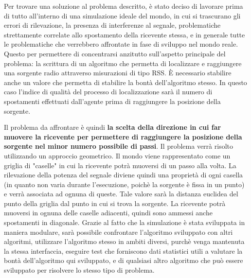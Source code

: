 Per trovare una soluzione al problema descritto, è stato deciso di lavorare prima di tutto all'interno di una simulazione ideale del mondo, in cui si trascurano gli errori di rilevazione, la presenza di interferenze al segnale, problematiche strettamente correlate allo spostamento della ricevente stessa, e in generale tutte le problematiche che verrebbero affrontate in fase di sviluppo nel mondo reale. Questo per permettere di concentrarsi anzitutto sull'aspetto principale del problema: la scrittura di un algoritmo che permetta di localizzare e raggiungere una sorgente radio attraverso misurazioni di tipo RSS. È necessario stabilire anche un valore che permetta di stabilire la bontà dell'algoritmo stesso. In questo caso l'indice di qualità del processo di localizzazione sarà il numero di spostamenti effettuati dall'agente prima di raggiungere la posizione della sorgente.

Il problema da affrontare è quindi \textbf{la scelta della direzione in cui far muovere la ricevente per permettere di raggiungere la posizione della sorgente nel minor numero possibile di passi}. Il problema verrà risolto utilizzando un approccio geometrico. Il mondo viene rappresentato come un griglia di "caselle" in cui la ricevente potrà muoversi di un passo alla volta. La rilevazione della potenza del segnale diviene quindi una proprietà di ogni casella (in quanto non varia durante l'esecuzione, poichè la sorgente è fissa in un punto) e verrà associata ad ognuna di queste. Tale valore sarà la distanza euclidea del punto della griglia dal punto in cui si trova la sorgente. La ricevente potrà muoversi in ognuna delle caselle adiacenti, quindi sono ammessi anche spostamenti in diagonale. Grazie al fatto che la simulazione è stata sviluppata in maniera modulare, sarà possibile confrontare l'algoritmo sviluppato con altri algoritmi, utilizzare l'algoritmo stesso in ambiti diversi, purchè venga mantenuta la stessa interfaccia, eseguire test che forniscono dati statistici utili a valutare la bontà dell'algoritmo qui sviluppato, e di qualsiasi altro algoritmo che può essere sviluppato per risolvere lo stesso tipo di problema. 

